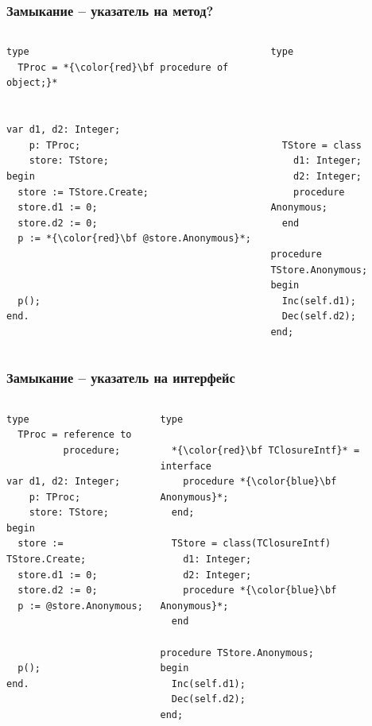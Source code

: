 \documentclass[roman,12pt]{beamer}
\begin{document}
\begin{frame}[fragile]
  \frametitle{Замыкание -- указатель на метод?}
  \begin{columns}[c]
    \column{2.2in}
     \begin{lstlisting}[escapechar=*,basicstyle=\scriptsize]
type
  TProc = *{\color{red}\bf procedure of object;}*


var d1, d2: Integer;
    p: TProc;
    store: TStore;
begin
  store := TStore.Create;
  store.d1 := 0;
  store.d2 := 0;
  p := *{\color{red}\bf @store.Anonymous}*;



  p();
end.
     \end{lstlisting}
   \column{2.2in}
     \begin{lstlisting}[escapechar=@,basicstyle=\scriptsize]  
type





  TStore = class
    d1: Integer;
    d2: Integer;
    procedure Anonymous;
  end
  
procedure TStore.Anonymous;
begin
  Inc(self.d1);
  Dec(self.d2);
end;

     \end{lstlisting}

  \end{columns}
\end{frame}

\begin{frame}[fragile]
  \frametitle{Замыкание -- указатель на интерфейс}
  \begin{columns}[c]
    \column{2.2in}
     \begin{lstlisting}[escapechar=*,basicstyle=\scriptsize]
type
  TProc = reference to
          procedure;

var d1, d2: Integer;
    p: TProc;
    store: TStore;
begin
  store := TStore.Create;
  store.d1 := 0;
  store.d2 := 0;
  p := @store.Anonymous;



  p();
end.
     \end{lstlisting}
   \column{2.2in}
     \begin{lstlisting}[escapechar=*,basicstyle=\scriptsize]  
type

  *{\color{red}\bf TClosureIntf}* = interface
    procedure *{\color{blue}\bf Anonymous}*;
  end;

  TStore = class(TClosureIntf)
    d1: Integer;
    d2: Integer;
    procedure *{\color{blue}\bf Anonymous}*;
  end
  
procedure TStore.Anonymous;
begin
  Inc(self.d1);
  Dec(self.d2);
end;

     \end{lstlisting}

  \end{columns}
\end{frame}
\end{document}
